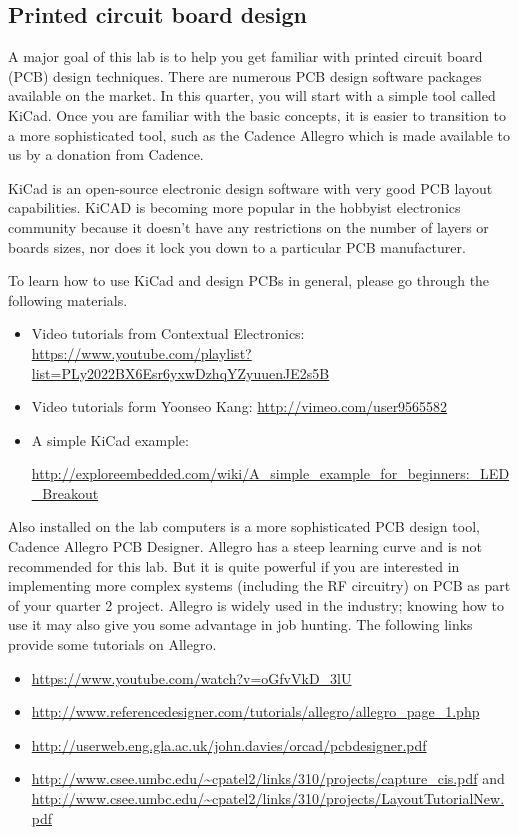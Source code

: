 \documentclass[letterpaper, 11pt]{article}
\begin{document}
\subsection{Printed circuit board design}
A major goal of this lab is to help you get familiar with printed circuit board (PCB) design techniques. There are numerous PCB design software packages available on the market. In this quarter, you will start with a simple tool called KiCad. Once you are familiar with the basic concepts, it is easier to transition to a more sophisticated tool, such as the Cadence Allegro which is made available to us by a donation from Cadence. 

KiCad is an open-source electronic design software with very good PCB layout capabilities. KiCAD is becoming more popular in the hobbyist electronics community because it doesn't have any restrictions on the number of layers or boards sizes, nor does it lock you down to a particular PCB manufacturer.

To learn how to use KiCad and design PCBs in general, please go through the following materials.

\begin{itemize}[itemsep=0.1ex]

	\item Video tutorials from Contextual Electronics:	 \url{https://www.youtube.com/playlist?list=PLy2022BX6Esr6yxwDzhqYZyuuenJE2s5B} 
	
	\item 	Video tutorials form  Yoonseo Kang:	 \url{http://vimeo.com/user9565582} 

	\item A simple KiCad example: 
	
	\url{http://exploreembedded.com/wiki/A_simple_example_for_beginners:_LED_Breakout} 
		
\end{itemize}

Also installed on the lab computers is a more sophisticated PCB design tool, Cadence Allegro PCB Designer. Allegro has a steep learning curve and is not recommended for this lab. But it is quite powerful if you are interested in implementing more complex systems (including the RF circuitry) on PCB as part of your quarter 2 project. Allegro is widely used in the  industry; knowing how to use it may also give you some advantage in job hunting. The following links provide some tutorials on Allegro. 

\begin{itemize}[itemsep=0.1ex]
	\item \url{https://www.youtube.com/watch?v=oGfvVkD_3lU}	
	\item \url{http://www.referencedesigner.com/tutorials/allegro/allegro_page_1.php}
	\item \url{http://userweb.eng.gla.ac.uk/john.davies/orcad/pcbdesigner.pdf}
	\item \url{http://www.csee.umbc.edu/~cpatel2/links/310/projects/capture_cis.pdf} and \\ \url{http://www.csee.umbc.edu/~cpatel2/links/310/projects/LayoutTutorialNew.pdf}
\end{itemize}
\end{document}
